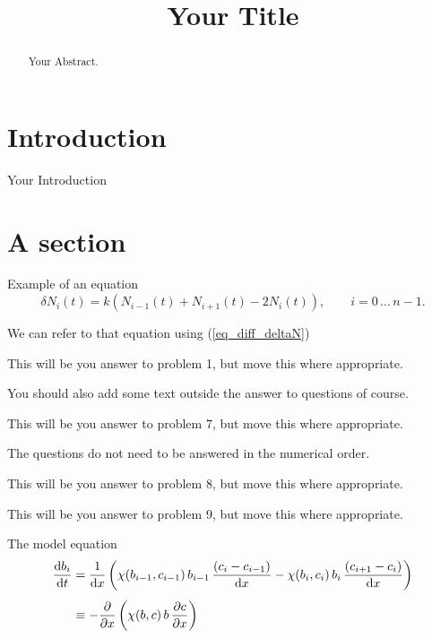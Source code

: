 \documentclass{mm2}
\title{Your Title}
\newcommand{\pdiff}[2]{\frac{\partial #1}{\partial #2}}
\begin{document}
\begin{abstract}
  Your Abstract.
\end{abstract}



\section{Introduction}
Your Introduction

\section{A section}

Example of an equation
\begin{equation}
\delta N_i(t) = k(N_{i-1}(t)+N_{i+1}(t)-2N_i(t)), \qquad i=0\, \dots\, n-1 .
  \label{eq_diff_deltaN} %
\end{equation}

We can refer to that equation using (\ref{eq_diff_deltaN})

\vspace{5mm}
\begin{answer}{1}
  This will be you answer to problem 1, but move this where appropriate.
\end{answer}

You should also add some text outside the answer to questions of course.

\vspace{5mm}
\begin{answer}{7}
  This will be you answer to problem 7, but move this where appropriate.
\end{answer}

The questions do not need to be answered in the numerical order.
\vspace{5mm}
\begin{answer}{8}
  This will be you answer to problem 8, but move this where appropriate.
\end{answer}

\begin{answer}{9}
  This will be you answer to problem 9, but move this where appropriate.
\end{answer}


The model equation
\begin{equation}
  \label{eq_chemo_disc}                           
  \begin{aligned}
  \frac{{\rm d}b_i}{{\rm d}t} &= \frac{1}{{\rm d}x}\left(\chi(b_{i-1},c_{i-1})\,b_{i-1}\,\frac{(c_{i}-c_{i-1})}{{\rm d}x}- \chi(b_i,c_i)\,b_i\,\frac{(c_{i+1}-c_{i})}{{\rm d}x}\right)\\[1ex]
                  &\equiv -\pdiff{}{x}\left(\chi(b,c)\, b\,
  \pdiff{c}{x}\right)
  \end{aligned}
\end{equation}
\end{document}
